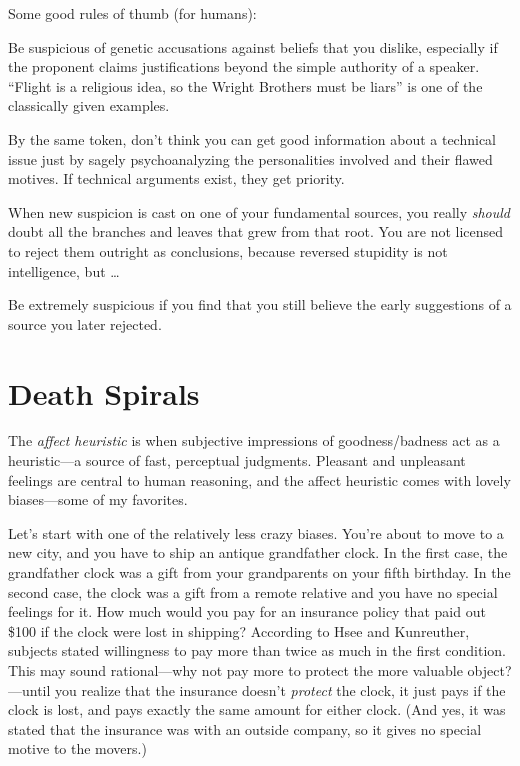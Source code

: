 {
 Some good rules of thumb (for humans):}

{
 Be suspicious of genetic accusations against beliefs that you
dislike, especially if the proponent claims justifications beyond the
simple authority of a speaker. ``Flight is a religious
idea, so the Wright Brothers must be liars'' is one
of the classically given examples.}

{
 By the same token, don't think you can get good
information about a technical issue just by sagely psychoanalyzing the
personalities involved and their flawed motives. If technical arguments
exist, they get priority.}

{
 When new suspicion is cast on one of your fundamental sources, you
really \textit{should} doubt all the branches and leaves that grew from
that root. You are not licensed to reject them outright as conclusions,
because reversed stupidity is not intelligence, but \ldots}

{
 Be extremely suspicious if you find that you still believe the
early suggestions of a source you later rejected.}

\myendsectiontext

\chapter{Death Spirals}


{
 The \textit{affect heuristic} is when subjective impressions of
goodness/badness act as a heuristic---a source of fast, perceptual
judgments. Pleasant and unpleasant feelings are central to human
reasoning, and the affect heuristic comes with lovely biases---some of
my favorites. }

{
 Let's start with one of the relatively less crazy
biases. You're about to move to a new city, and you
have to ship an antique grandfather clock. In the first case, the
grandfather clock was a gift from your grandparents on your fifth
birthday. In the second case, the clock was a gift from a remote
relative and you have no special feelings for it. How much would you
pay for an insurance policy that paid out \$100 if the clock were lost
in shipping? According to Hsee and Kunreuther, subjects stated
willingness to pay more than twice as much in the first
condition. This may sound rational---why not pay
more to protect the more valuable object?---until you realize that the
insurance doesn't \textit{protect} the clock, it just
pays if the clock is lost, and pays exactly the same amount for either
clock. (And yes, it was stated that the insurance was with an outside
company, so it gives no special motive to the movers.)}

